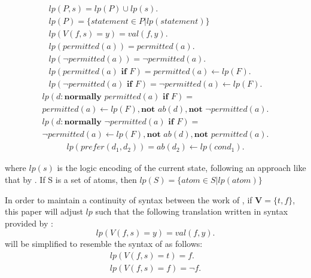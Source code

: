 \begin{gather}
    lp(P,s) = lp(P)\cup lp(s). \label{eq:apl_lp_01} \\
    lp(P)=\{statement \in P | lp(statement)\} \label{eq:apl_lp_02} \\
    lp\left(V(f,s)=y\right) =
        val\left(f,y\right). \label{eq:apl_lp_03} \\
    lp(permitted(a)) =
        permitted(a). \label{eq:apl_lp_04} \\
    lp(\neg permitted(a)) =
        \neg permitted(a). \label{eq:apl_lp_05} \\
    lp(permitted(a) \textbf{ if } F) =
        permitted(a) \leftarrow
            lp(F). \label{eq:apl_lp_06} \\
    lp(\neg permitted(a) \textbf{ if } F) =
        \neg permitted(a) \leftarrow
            lp(F). \label{eq:apl_lp_07}
\end{gather}
\begin{multline}
    \label{eq:apl_lp_08}
    lp(d: \textbf{normally } permitted(a) \textbf{ if } F) = \\
        permitted(a) \leftarrow
            lp(F),
            \textbf{not } ab(d),
            \textbf{not } \neg permitted(a).
\end{multline}
\begin{multline}
    \label{eq:apl_lp_09}
    lp(d: \textbf{normally } \neg permitted(a) \textbf{ if } F) = \\
        \neg permitted(a) \leftarrow
        lp(F),
        \textbf{not } ab(d),
        \textbf{not } permitted(a).
\end{multline}
\begin{gather}
    lp(prefer(d_1, d_2)) =
        ab(d_2) \leftarrow lp(cond_1). \label{eq:apl_lp_10}
\end{gather}

\noindent
where $lp(s)$ is the logic encoding of the current state, following an approach like that by \citet{balduccini_aaa_2008}.
If S is a set of atoms, then $lp(S)=\{atom \in S | lp(atom)\}$

In order to maintain a continuity of syntax between the work of \citet{gelfond_action_1998,balduccini_aaa_2008,blount_architecture_2013,gelfond_authorization_2008}, if $\boldsymbol{V} = \{t,f\}$, this paper will adjust $lp$ such that the following translation written in syntax provided by \citet{gelfond_authorization_2008}:
\[
    lp\left(V(f,s)=y\right) =
        val\left(f,y\right).
\]
will be simplified to resemble the syntax of \citet{gelfond_action_1998,balduccini_aaa_2008,blount_architecture_2013} as follows:
\begin{gather}
    lp\left(V(f,s)=t\right) =
        f. \\
    lp\left(V(f,s)=f\right) =
        \neg f. \\
\end{gather}

